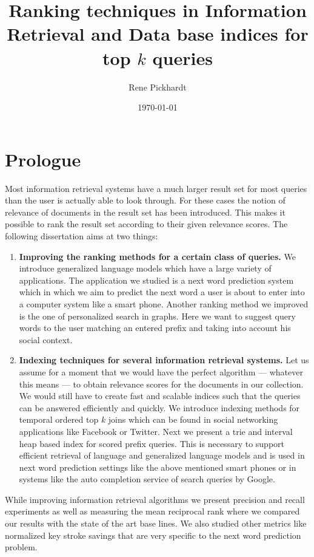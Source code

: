\documentclass[•]{article}
\title{Ranking techniques in Information Retrieval and Data base indices for top $k$ queries}
\author{Rene Pickhardt}
\date{\today}
\begin{document}
\maketitle
\tableofcontents
\pagebreak
\section{Prologue}
Most information retrieval systems \cite{} have a much larger result set for most queries than the user is actually able to look through.
For these cases the notion of relevance of documents in the result set has been introduced. 
This makes it possible to rank the result set according to their given relevance scores.
The following dissertation aims at two things: 

\begin{enumerate}
\item \textbf{Improving the ranking methods for a certain class of queries.}
We introduce generalized language models which have a large variety of applications\cite{own:typology:2013}. 
The application we studied is a next word prediction system which in which we aim to predict the next word a user is about to enter into a computer system like a smart phone. 
Another ranking method we improved is the one of personalized search in graphs\cite{own:graphSearch:2013}.
Here we want to suggest query words to the user matching an entered prefix and taking into account his social context.

\item \textbf{Indexing techniques for several information retrieval systems.}
Let us assume for a moment that we would have the perfect algorithm --- whatever this means --- to obtain relevance scores for the documents in our collection.
We would still have to create fast and scalable indices such that the queries can be answered efficiently and quickly.
We introduce indexing methods for temporal ordered top $k$ joins \cite{own:graphity:2012} which can be found in social networking applications like Facebook or Twitter.
Next we present a trie and interval heap based index for scored prefix queries\cite{own:prefix:2013}. 
This is necessary to support efficient retrieval of language and generalized language models and is used in next word prediction settings like the above mentioned smart phones or in systems like the auto completion service of search queries by Google.
\end{enumerate}

While improving information retrieval algorithms we present precision and recall experiments as well as measuring the mean reciprocal rank where we compared our results with the state of the art base lines. 
We also studied other metrics like normalized key stroke savings that are very specific to the next word prediction problem.
\end{document}
